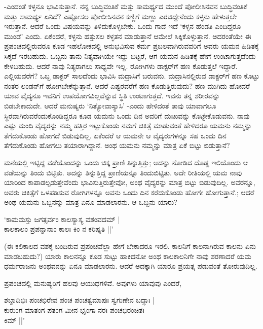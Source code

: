 -ಎಂದಂತೆ ಕಳ್ಳನೂ ಭಾವಿಸುತ್ತಾನೆ. ನನ್ನ ಬುದ್ಧಿವಂತಿಕೆ ಮತ್ತು ಸಾಮರ್ಥ್ಯದ ಮುಂದೆ ಪೋಲೀಸಿನವನ ಬುದ್ಧಿವಂತಿಕೆ ಮತ್ತು ಸಾಮರ್ಥ್ಯ ಏನಿದೆ? ಎಷ್ಟೋಸಲ ಪೋಲೀಸಿನವನ ಕಣ್ಣಿಗೆ ಮಣ್ಣು ಎರಚಿದ್ದೇನೆಂದು ಕಳ್ಳನು ಹೇಳುತ್ತಲೇ ಇರುತ್ತಾನೆ. ಆದರೆ ಒಂದು ವಿಷಯವನ್ನು ತಿಳಿದುಕೊಳ್ಳಬೇಕು. ಒಂದು ಗಾದೆ ಇದೆ `ಕಳ್ಳನ ಹೆಂಡತಿ ಎಂದಿದ್ದರೂ ಮುಂಡೆ' ಎಂದು. ಏಕೆಂದರೆ, ಕಳ್ಳನು ಹತ್ತುಸಲ ಕಳ್ಳತನ ಮಾಡುತ್ತಾನೆ ಆಮೇಲೆ ಸಿಕ್ಕಿಕೊಳ್ಳುತ್ತಾನೆ. ಅದರಂತೆಯೇ ಈ ಪ್ರಪಂಚದಲ್ಲಿರುವರೂ ಕೂಡ ಇಹಲೋಕದಲ್ಲಿ ಅನುಭವಿಸುವ ಕರ್ಮ ಪ್ರಬಲವಾಗಿರುವವರಿಗೆ ಅವರು ಯಮನ ಹಿಡಿತಕ್ಕೆ ಸಿಕ್ಕದೆ ಇರಬಹುದು. ಒಬ್ಬನು ತಾನು ನಿತ್ಯವಾಗಿಯೇ ಇದ್ದು ಬಿಟ್ಟರೆ, ಆಗ ಯಮನ ಹಿಡಿತಕ್ಕೆ ಹೇಗೆ ಉಂಟಾಗುತ್ತದೆಂದು ಕೇಳಬಹುದು. ಆದರೆ ನಾವು ನಿತ್ಯರಾಗಲು ಸಾಧ್ಯವೇ ಇಲ್ಲ. ರೋಗಿಗಳು ಡಾಕ್ಟರ್‌ಗೆ ಹಣ ಕೊಡುತ್ತಲೆ ಇದ್ದಾರೆ. ಎಲ್ಲಿಯವರೆಗೆ? ಒಬ್ಬ ಡಾಕ್ಟರ್ ಸಾಲದೆಂದು ಭಾವಿಸಿ ಮದ್ರಾಸಿಗೆ ಬರುವನು. ಮದ್ರಾಸಿನಲ್ಲಿರುವ ಡಾಕ್ಟರ್‌ಗೆ ಹಣ ಕೊಟ್ಟು ನಂತರ ಲಂಡನ್‌ಗೆ ಹೋಗಬೇಕೆನ್ನುತ್ತಾನೆ. ಆದರೆ ಎಷ್ಟರವರೆಗೆ ಹಣ ಕೊಡುತ್ತಿರುವುದು? ಹಣ ಮುಗಿದು ಹೋದರೆ ಯಾವ ವೈದ್ಯನೂ ಇವನಿಗೆ ಉಪಯೋಗವಿಲ್ಲವೆನ್ನುವ ಸ್ಥಿತಿ ಉಂಟಾಗುತ್ತದೆ. ಇವನು ತನ್ನ ಶರೀರವನ್ನು ಬಿಡಬೇಕಾದುದೇ. ಆದರೆ ಮನುಷ್ಯರು `ನಿತ್ಯೋವಾಸ್ಯಾಸಿ' -ಎಂದು ಹೇಳಿದಂತೆ ತಾವು ಯಾವಾಗಲೂ ಸ್ಥಿರವಾಗಿರುವರೆಂದುಕೊಂಡಿದ್ದರೂ ಕೂಡ ಯಮನು ಒಂದು ದಿನ ಅವರಿಗೆ ದುಃಖವನ್ನು ಕೊಟ್ಟೇಕೊಡುವನು. ನಾವು ಎಷ್ಟು ಮಂದಿ ವೈದ್ಯರನ್ನು ನಮ್ಮ ಹತ್ತಿರ ಇಟ್ಟುಕೊಂಡು ನಮಗೆ ಚಿಕಿತ್ಸೆ ಮಾಡುವಂತೆ ಹೇಳಿದರೂ ಯಮನು ನಮ್ಮನ್ನು ತೆಗೆದುಕೊಂಡು ಹೋಗದೆ ಬಿಡುವುದಿಲ್ಲ. ಏಕೆಂದರೆ ಆ ಯಮನೇ ಆ ವೈದ್ಯರುಗಳನ್ನೂ ಸಹ ಒಂದು ದಿನ ತೆಗೆದುಕೊಂಡು ಹೋಗಲು ತಯಾರಾಗಿದ್ದಾನೆ. ಅಂಥ ಯಮನು ನಮ್ಮನ್ನು ಮಾತ್ರ ಏಕೆ ಬಿಟ್ಟು ಬಿಡುತ್ತಾನೆ?

ಮನೆಯಲ್ಲಿ ಇಟ್ಟಿದ್ದ ವಡೆಯೊಂದನ್ನು ಒಂದು ಚಿಕ್ಕ ಪ್ರಾಣಿ ತಿನ್ನುತ್ತಿತ್ತು; ಅದನ್ನು ನೋಡಿದ ದೊಡ್ಡ  ಇಲಿಯೊಂದು ಆ ವಡೆಯನ್ನು ತಿಂದು ಬಿಟ್ಟಿತು. ಅದನ್ನು ತಿನ್ನುತ್ತಿದ್ದ ಪ್ರಾಣಿಯನ್ನೂ ತಿಂದುಬಿಟ್ಟಿತು. ಅದೇ ರೀತಿಯಲ್ಲಿ ಯಮ ನಾವು ಯಾರಿಂದ ಕಾಪಾಡಲ್ಪಡುತ್ತೇವೆಂದು ಭಾವಿಸುತ್ತಿರುತ್ತೇವೋ, ಅಂಥ ವೈದ್ಯರನ್ನು ಮಾತ್ರ ಬಿಟ್ಟು ಬಿಡುವುದಿಲ್ಲ. ಅವರನ್ನೂ, ಅವರು ಚಿಕಿತ್ಸೆಗೆ ಒಳಪಡಿಸುವ ರೋಗಿಗಳನ್ನೂ ಅವನು ಒಂದು ದಿನ ಕರೆದುಕೊಂಡು ಹೋಗೇ ಹೋಗುತ್ತಾನೆ.; ಆದರೆ ಅಂಥ ಯಮನು ಒಬ್ಬನನ್ನು ಮಾತ್ರ ಏನೂ ಮಾಡಲಾರನು. ಆ ಒಬ್ಬನು ಯಾರು?

\begin{shloka}
`ಕಾಮಮಸ್ತು ಜಗತ್ಸರ್ವಂ ಕಾಲಸ್ಯಾಸ್ಯ ವಶಂವದಮ್ |\\
ಕಾಲಕಾಲಂ ಪ್ರಪನ್ನಾನಾಂ ಕಾಲಃ ಕಿಂ ನ ಕರಿಷ್ಯತಿ ||'
\end{shloka}

(ಈ ಕಲಿಕಾಲದ ವಶಕ್ಕೆ ಬಂದಿರುವ ಪ್ರಪಂಚವೆಲ್ಲಾ ಹೇಗೆ ಬೇಕಾದರೂ ಇರಲಿ. ಕಾಲನಿಗೆ ಕಾಲನಾಗಿರುವ ಕಾಲನು ಏನು ಮಾಡಬಹುದು?) ಯಾರು ಕಾಲನನ್ನೂ ಕೂಡ ಸುಟ್ಟು ಹಾಕಿದನೋ ಅಂಥ ಕಾಲಕಾಲನಿಗೇ ನಾವು ಶರಣಾದರೆ ಯಮ ಧರ್ಮರಾಜನು ಅಂಥವನನ್ನು ಏನೂ ಮಾಡಲಾರನು. ಆದರೆ ಅದಕ್ಕಾಗಿ ಯಾರೂ ಪ್ರಯತ್ನ ಪಡುವಂತೆ ತೋರುವುದಿಲ್ಲ.

ಪ್ರಪಂಚದಲ್ಲಿ ಮನುಷ್ಯರಿಗೆ ಹಲವು ಆಯುಧಗಳಿವೆ. ಅವುಗಳು ಯಾವುವು ಎಂದರೆ,

\begin{shloka}
ಶಬ್ದಾದಿಭಿಃ ಪಂಚಭಿರೇವ ಪಂಚ ಪಂಚತ್ವಮಾಪುಃ ಸ್ವಗುಣೇನ ಬದ್ಧಾಃ |\\
ಕುರುಂಗ-ಮಾತಂಗ-ಪತಂಗ-ಮೀನ-ಭೃಂಗಾ ನರಃ ಪಂಚಭಿರಂಚಿತಃ\\
\hspace{5.5cm} ಕಿಮ್ ||'
\end{shloka}

